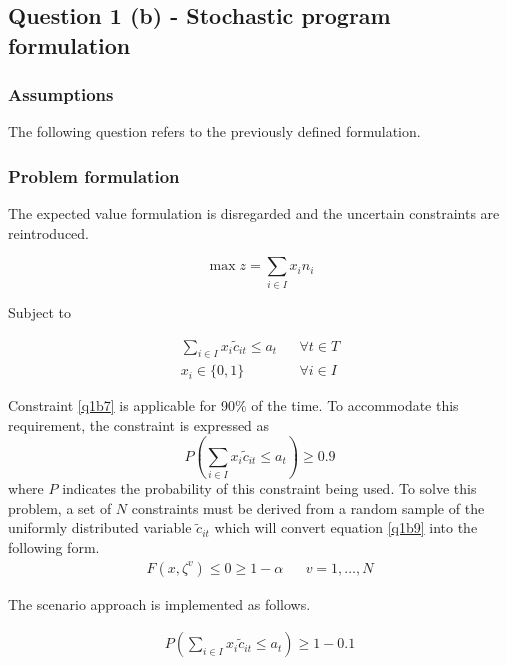 \documentclass[a4paper,11pt]{article}
\begin{document}
\newpage


\subsection{Question 1 (b) - Stochastic program formulation}

\subsubsection{Assumptions}
The following question refers to the previously defined formulation.

\subsubsection{Problem formulation}
The expected value formulation is disregarded and the uncertain constraints are reintroduced.

\begin{equation}
	\max z = \sum_{i\in I} x_i n_i
\end{equation}

Subject to

\begin{align}
	\sum_{i\in I} x_i\tilde{c}_{it} \leq a_t && \forall t\in T \label{q1b7}		\\
	x_i \in \{0,1\} && \forall i\in I
\end{align}

Constraint \ref{q1b7} is applicable for 90\% of the time. To accommodate this requirement, the constraint is expressed as
\begin{equation}
	P(\sum_{i\in I} x_i\tilde{c}_{it} \leq a_t)\geq 0.9
	\label{q1b9}
\end{equation}
where $P$ indicates the probability of this constraint being used. To solve this problem, a set of $N$ constraints must be derived from a random sample of the uniformly distributed variable $\tilde{c}_{it}$ which will convert equation \ref{q1b9} into the following form.
\begin{align}
	F(x,\zeta^v)\leq 0 \geq 1 - \alpha && v=1,\dots,N
\end{align}

The scenario approach is implemented as follows.

\begin{align}
	P(\sum_{i\in I} x_i\tilde{c}_{it} \leq a_t)\geq  1-0.1
	\label{q1b11}
\end{align}
\end{document}
